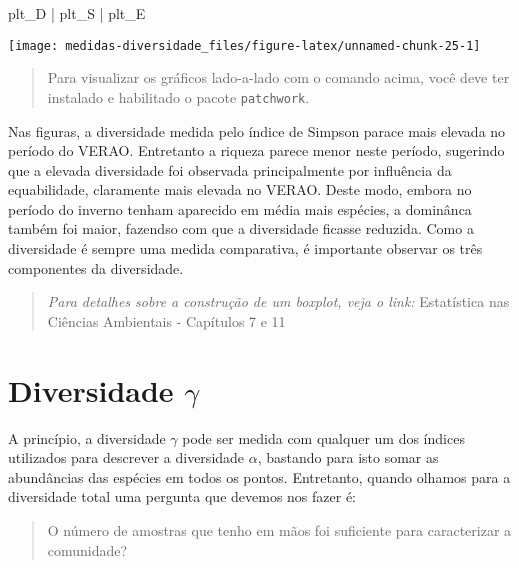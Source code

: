 \documentclass[
]{book}
\newenvironment{Shaded}{\begin{snugshade}}{\end{snugshade}}
\newcommand{\NormalTok}[1]{#1}
\newcommand{\SpecialCharTok}[1]{\textcolor[rgb]{0.00,0.00,0.00}{#1}}
\begin{document}
\begin{Shaded}
\begin{Highlighting}[]
\NormalTok{plt\_D }\SpecialCharTok{|}\NormalTok{ plt\_S }\SpecialCharTok{|}\NormalTok{ plt\_E}
\end{Highlighting}
\end{Shaded}

\begin{center}\texttt{[image: medidas-diversidade\_files/figure-latex/unnamed-chunk-25-1]} \end{center}

\begin{quote}
Para visualizar os gráficos lado-a-lado com o comando acima, você deve ter instalado e habilitado o pacote \texttt{patchwork}.
\end{quote}

Nas figuras, a diversidade medida pelo índice de Simpson parace mais elevada no período do VERAO. Entretanto a riqueza parece menor neste período, sugerindo que a elevada diversidade foi observada principalmente por influência da equabilidade, claramente mais elevada no VERAO. Deste modo, embora no período do inverno tenham aparecido em média mais espécies, a dominânca também foi maior, fazendso com que a diversidade ficasse reduzida. Como a diversidade é sempre uma medida comparativa, é importante observar os três componentes da diversidade.

\begin{quote}
\emph{Para detalhes sobre a construção de um boxplot, veja o link:} Estatística nas Ciências Ambientais - Capítulos 7 e 11
\end{quote}

\hypertarget{diversidade-gamma}{%
\section{\texorpdfstring{Diversidade \(\gamma\)}{Diversidade \textbackslash gamma}}\label{diversidade-gamma}}

A princípio, a diversidade \(\gamma\) pode ser medida com qualquer um dos índices utilizados para descrever a diversidade \(\alpha\), bastando para isto somar as abundâncias das espécies em todos os pontos. Entretanto, quando olhamos para a diversidade total uma pergunta que devemos nos fazer é:

\begin{quote}
O número de amostras que tenho em mãos foi suficiente para caracterizar a comunidade?
\end{quote}
\end{document}
